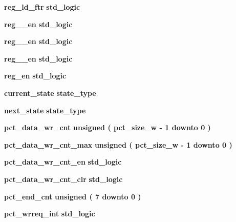 \begin{DoxyCompactItemize}
{\bf reg\+\_\+ld\+\_\+ftr} {\bfseries \textcolor{comment}{std\+\_\+logic}\textcolor{vhdlchar}{ }} 
\item 
{\bf reg\+\_\+\_\+en} {\bfseries \textcolor{comment}{std\+\_\+logic}\textcolor{vhdlchar}{ }} 
\item 
{\bf reg\+\_\+\_\+en} {\bfseries \textcolor{comment}{std\+\_\+logic}\textcolor{vhdlchar}{ }} 
\item 
{\bf reg\+\_\+\_\+en} {\bfseries \textcolor{comment}{std\+\_\+logic}\textcolor{vhdlchar}{ }} 
\item 
{\bf reg\+\_\+en} {\bfseries \textcolor{comment}{std\+\_\+logic}\textcolor{vhdlchar}{ }} 
\item 
{\bf current\+\_\+state} {\bfseries {\bfseries {\bf state\+\_\+type}} \textcolor{vhdlchar}{ }} 
\item 
{\bf next\+\_\+state} {\bfseries {\bfseries {\bf state\+\_\+type}} \textcolor{vhdlchar}{ }} 
\item 
{\bf pct\+\_\+data\+\_\+wr\+\_\+cnt} {\bfseries \textcolor{comment}{unsigned}\textcolor{vhdlchar}{ }\textcolor{vhdlchar}{(}\textcolor{vhdlchar}{ }\textcolor{vhdlchar}{ }\textcolor{vhdlchar}{ }\textcolor{vhdlchar}{ }{\bfseries {\bf pct\+\_\+size\+\_\+w}} \textcolor{vhdlchar}{-\/}\textcolor{vhdlchar}{ } \textcolor{vhdldigit}{1} \textcolor{vhdlchar}{ }\textcolor{keywordflow}{downto}\textcolor{vhdlchar}{ }\textcolor{vhdlchar}{ } \textcolor{vhdldigit}{0} \textcolor{vhdlchar}{ }\textcolor{vhdlchar}{)}\textcolor{vhdlchar}{ }} 
\item 
{\bf pct\+\_\+data\+\_\+wr\+\_\+cnt\+\_\+max} {\bfseries \textcolor{comment}{unsigned}\textcolor{vhdlchar}{ }\textcolor{vhdlchar}{(}\textcolor{vhdlchar}{ }\textcolor{vhdlchar}{ }\textcolor{vhdlchar}{ }\textcolor{vhdlchar}{ }{\bfseries {\bf pct\+\_\+size\+\_\+w}} \textcolor{vhdlchar}{-\/}\textcolor{vhdlchar}{ } \textcolor{vhdldigit}{1} \textcolor{vhdlchar}{ }\textcolor{keywordflow}{downto}\textcolor{vhdlchar}{ }\textcolor{vhdlchar}{ } \textcolor{vhdldigit}{0} \textcolor{vhdlchar}{ }\textcolor{vhdlchar}{)}\textcolor{vhdlchar}{ }} 
\item 
{\bf pct\+\_\+data\+\_\+wr\+\_\+cnt\+\_\+en} {\bfseries \textcolor{comment}{std\+\_\+logic}\textcolor{vhdlchar}{ }} 
\item 
{\bf pct\+\_\+data\+\_\+wr\+\_\+cnt\+\_\+clr} {\bfseries \textcolor{comment}{std\+\_\+logic}\textcolor{vhdlchar}{ }} 
\item 
{\bf pct\+\_\+end\+\_\+cnt} {\bfseries \textcolor{comment}{unsigned}\textcolor{vhdlchar}{ }\textcolor{vhdlchar}{(}\textcolor{vhdlchar}{ }\textcolor{vhdlchar}{ } \textcolor{vhdldigit}{7} \textcolor{vhdlchar}{ }\textcolor{keywordflow}{downto}\textcolor{vhdlchar}{ }\textcolor{vhdlchar}{ } \textcolor{vhdldigit}{0} \textcolor{vhdlchar}{ }\textcolor{vhdlchar}{)}\textcolor{vhdlchar}{ }} 
\item 
{\bf pct\+\_\+wrreq\+\_\+int} {\bfseries \textcolor{comment}{std\+\_\+logic}\textcolor{vhdlchar}{ }} 
\end{DoxyCompactItemize}


